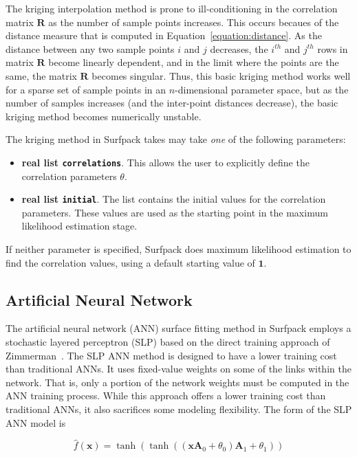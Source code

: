 \documentclass{article}
\begin{document}
The kriging interpolation method is prone to ill-conditioning in the correlation matrix $\mathbf{R}$ as the number of sample points increases.  This occurs becaues of the distance measure that is computed in Equation~\ref{equation:distance}.  As the distance between any two sample points $i$ and $j$ decreases, the $i^{th}$ and $j^{th}$ rows in matrix $\mathbf{R}$ become linearly dependent, and in the limit where the points are the same, the matrix $\mathbf{R}$ becomes singular.  Thus, this basic kriging method works well for a sparse set of sample points in an $n$-dimensional parameter space, but as the number of samples increases (and the inter-point distances decrease), the basic kriging method becomes numerically unstable.

The kriging method in Surfpack takes may take {\em one} of the following parameters:
\begin{itemize}
\item {\bf real list \texttt{correlations}}.  This allows the user to explicitly define the correlation parameters $\theta$.
\item {\bf real list \texttt{initial}}. The list contains the initial values for the correlation parameters.  These values are used as the starting point in the maximum likelihood estimation stage.
\end{itemize}
If neither parameter is specified, Surfpack does maximum likelihood estimation to find the correlation values, using a default starting value of $\mathbf{1}$. 

\subsection{Artificial Neural Network}\label{models:surf:ann}

The artificial neural network (ANN) surface fitting method in Surfpack employs a stochastic layered
perceptron (SLP) based on the direct
training approach of Zimmerman~\cite{zimmerman}. The SLP ANN method is
designed to have a lower training cost than traditional ANNs.  It uses fixed-value weights on some of the links within the network. That is, only a portion of the network weights must be computed in the ANN training process.  While this approach offers a lower training cost than traditional ANNs, it also sacrifices some modeling flexibility.  The form of
the SLP ANN model is

\begin{equation}
  \hat{f}(\mathbf{x}) = 
  \tanh(\tanh((\mathbf{x A}_{0}+\theta_{0})\mathbf{A}_{1}+\theta_{1}))
  \label{models:surf:equation09}
\end{equation}
\end{document}
